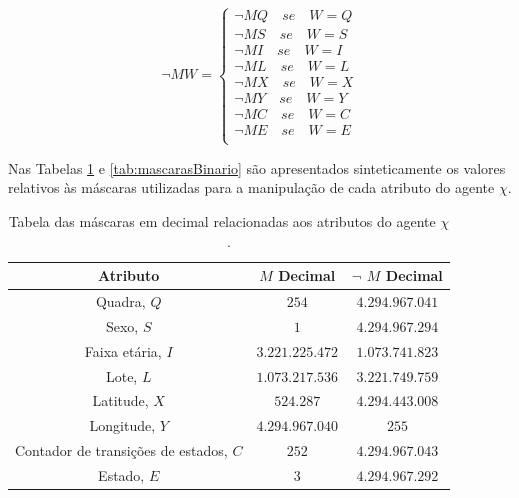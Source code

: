 \begin{equation}
\neg MW= 
 \begin{cases}
 \neg MQ \quad se \quad W=Q   \\
 \neg MS \quad se \quad W=S  \\
 
 \neg MI \quad se \quad W=I  \\
 \neg ML \quad se \quad W=L  \\ 
 \neg MX \quad se \quad W=X  \\
 
 \neg MY \quad se \quad W=Y   \\
 \neg MC \quad se \quad W=C   \\
 \neg ME \quad se \quad W=E  \\
 \end{cases}
 \label{eq:mascarasNegativas_2}
\end{equation}

Nas Tabelas \ref{tab:mascarasDecimal} e \ref{tab:mascarasBinario} são apresentados sinteticamente os valores relativos às máscaras utilizadas para a manipulação de cada atributo do agente $\chi$.
\begin{table}[H]
\centering
\begin{tabular}{c|c|c}
 \textbf{Atributo} 				& \textbf{$M$ Decimal}	& \textbf{$\neg$ $M$ Decimal} 	\\ \hline
 Quadra, $Q$ 					& $254$			& $4.294.967.041$   		\\
 Sexo, $S$ 					& $1$			& $4.294.967.294$  		\\
 
 Faixa etária, $I$ 				& $3.221.225.472$	& $1.073.741.823$   		\\
 Lote, $L$ 					& $1.073.217.536$	& $3.221.749.759$  		\\
 Latitude, $X$		 			& $524.287$		& $4.294.443.008$  		\\
 
 Longitude, $Y$ 				& $4.294.967.040$	& $255$		  		\\
 Contador de transições de estados, $C$ 	& $252$			& $4.294.967.043$  		\\
 Estado, $E$					& $3$			& $4.294.967.292$  		\\
\end{tabular}
\caption{Tabela das máscaras em decimal relacionadas aos atributos do agente $\chi$.}
\label{tab:mascarasDecimal}
\end{table}

